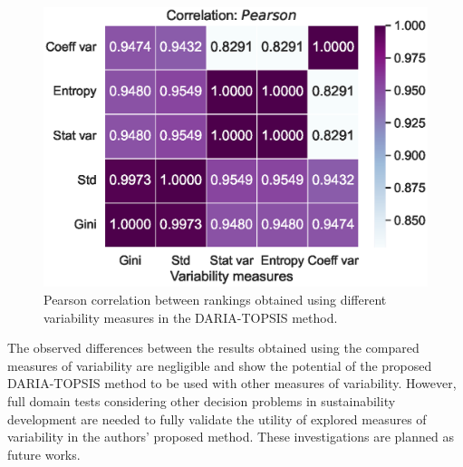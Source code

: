 \documentclass[final,5p,times,twocolumn,authoryear]{elsarticle}
\begin{document}
\begin{figure}[H]
    \centering
    \includegraphics[width=0.7\linewidth]{pearson.eps}
    \caption{Pearson correlation between rankings obtained using different variability measures in the DARIA-TOPSIS method.}
    \label{fig:compareVarMeasuresCorrs}
\end{figure}
%
The observed differences between the results obtained using the compared measures of variability are negligible and show the potential of the proposed DARIA-TOPSIS method to be used with other measures of variability. However, full domain tests considering other decision problems in sustainability development are needed to fully validate the utility of explored measures of variability in the authors' proposed method. These investigations are planned as future works.
\end{document}
